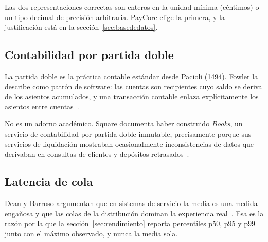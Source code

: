 Las dos representaciones correctas son enteros en la unidad mínima (céntimos)
o un tipo decimal de precisión arbitraria. PayCore elige la primera, y la
justificación está en la sección~\ref{sec:basededatos}.

\subsection{Contabilidad por partida doble}

La partida doble es la práctica contable estándar desde Pacioli (1494). Fowler
la describe como patrón de software: las cuentas son recipientes cuyo saldo se
deriva de los asientos acumulados, y una transacción contable enlaza
explícitamente los asientos entre cuentas~\cite{fowler2006}.

No es un adorno académico. Square documenta haber construido \emph{Books}, un
servicio de contabilidad por partida doble inmutable, precisamente porque sus
servicios de liquidación mostraban ocasionalmente inconsistencias de datos que
derivaban en consultas de clientes y depósitos retrasados~\cite{square2019}.

\subsection{Latencia de cola}

Dean y Barroso argumentan que en sistemas de servicio la media es una medida
engañosa y que las colas de la distribución dominan la experiencia
real~\cite{dean2013}. Esa es la razón por la que la
sección~\ref{sec:rendimiento} reporta percentiles p50, p95 y p99 junto con el
máximo observado, y nunca la media sola.
